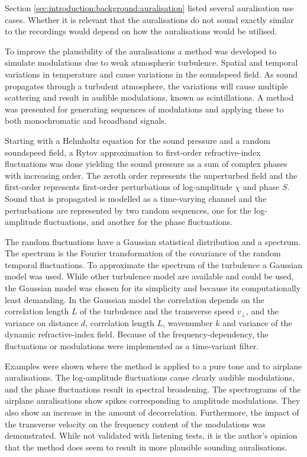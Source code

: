 Section \ref{sec:introduction:background:auralisation} listed several
auralisation use cases. Whether it is relevant that the auralisations do not
sound exactly similar to the recordings would depend on how the auralisations
would be utilised.

To improve the plausibility of the auralisations
a method was developed to simulate modulations due to weak atmospheric
turbulence. Spatial and temporal variations in temperature and cause variations
in the soundspeed field. As sound propagates through a turbulent atmosphere, the
variations will cause multiple scattering and result in audible modulations,
known as scintillations. A method was presented for generating sequences of
modulations and applying these to both monochromatic and broadband signals.

Starting with a Helmholtz equation for the sound pressure and a random
soundspeed field, a Rytov approximation to first-order refractive-index
fluctuations was done yielding the sound pressure as a sum of complex phases
with increasing order. The zeroth order represents the unperturbed field and the
first-order represents first-order perturbations of log-amplitude $\chi$ and
phase $S$. Sound that is propagated is modelled as a time-varying channel and
the perturbations are represented by two random sequences, one for the
log-amplitude fluctuations, and another for the phase fluctuations.

The random fluctuations have a Gaussian statistical distribution and a spectrum.
The spectrum is the Fourier transformation of the covariance of the random
temporal fluctuations. To approximate the spectrum of the turbulence a Gaussian
model was used. While other turbulence model are available and could be used,
the Gaussian model was chosen for its simplicity and because its computationally
least demanding. In the Gaussian model the correlation depends on the
correlation length $L$ of the turbulence and the transverse speed $v_{\bot}$, and
the variance on distance $d$, correlation length $L$, wavenumber $k$ and
variance of the dynamic refractive-index field. Because of the
frequency-dependency, the fluctuations or modulations were implemented as a
time-variant filter.

Examples were shown where the method is applied to a pure tone and to airplane
auralisations. The log-amplitude fluctuations cause clearly audible modulations,
and the phase fluctuations result in spectral broadening. The spectrograms of
the airplane auralisations show spikes corresponding to amplitude modulations.
They also show an increase in the amount of decorrelation. Furthermore, the
impact of the transverse velocity on the frequency content of the modulations
was demonstrated. While not validated with listening tests, it is the author's
opinion that the method does seem to result in more plausible sounding
auralisations.

